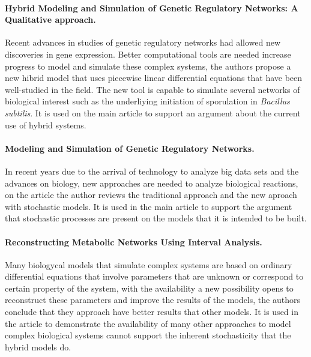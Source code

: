 \documentclass{article}
\begin{document}
\paragraph{Hybrid Modeling and Simulation of Genetic Regulatory Networks: A Qualitative approach. \cite{hidde_de_jong_hybrid_2003}}

Recent advances in studies of genetic regulatory networks had allowed new discoveries in gene expression. Better computational tools are needed increase progress to model and simulate these complex systems, the authors propose a new hibrid model that uses piecewise linear differential equations that have been well-studied in the field. The new tool is capable to simulate several networks of biological interest such as the underliying initiation of sporulation in \textit{Bacillus subtilis}. It is used on the main article to support an argument about the current use of hybrid systems.

\paragraph{Modeling and Simulation of Genetic Regulatory Networks.\cite{hidde_de_jong_modeling_2003}}

In recent years due to the arrival of technology to analyze big data sets and the advances on biology, new approaches are needed to analyze biological reactions, on the article the author reviews the traditional approach and the new aproach with stochastic models. It is used in the main article to support the argument that stochastic processes are present on the models that it is intended to be built.

\paragraph{Reconstructing Metabolic Networks Using Interval Analysis.\cite{warwick_tucker_reconstructing_2003}}

Many biologycal models that simulate complex systems are based on ordinary differential equations that involve parameters that are unknown or correspond to certain property of the system, with the availability a new possibility opens to reconstruct these parameters and improve the results of the models, the authors conclude that they approach have better results that other models. It is used in the article to demonstrate the availability of many other approaches to model complex biological systems cannot support the inherent stochasticity that the hybrid models do.
\end{document}
